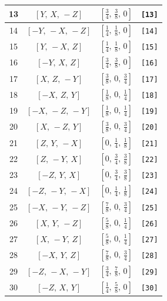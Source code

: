 \documentclass[fleqn,8pt]{jsarticle}
\begin{document}
\begin{longtable}{cccc}
13 & $\left[ Y,\, X,\, - Z \right]$ & $\left[ \frac{3}{4},\, \frac{3}{8},\, 0 \right]$ & {\tt [13]} \\ \hline
14 & $\left[ - Y,\, - X,\, - Z \right]$ & $\left[ \frac{1}{4},\, \frac{1}{8},\, 0 \right]$ & {\tt [14]} \\ \hline
15 & $\left[ Y,\, - X,\, Z \right]$ & $\left[ \frac{1}{4},\, \frac{1}{8},\, 0 \right]$ & {\tt [15]} \\ \hline
16 & $\left[ - Y,\, X,\, Z \right]$ & $\left[ \frac{3}{4},\, \frac{3}{8},\, 0 \right]$ & {\tt [16]} \\ \hline
17 & $\left[ X,\, Z,\, - Y \right]$ & $\left[ \frac{3}{8},\, 0,\, \frac{3}{4} \right]$ & {\tt [17]} \\ \hline
18 & $\left[ - X,\, Z,\, Y \right]$ & $\left[ \frac{1}{8},\, 0,\, \frac{1}{4} \right]$ & {\tt [18]} \\ \hline
19 & $\left[ - X,\, - Z,\, - Y \right]$ & $\left[ \frac{1}{8},\, 0,\, \frac{1}{4} \right]$ & {\tt [19]} \\ \hline
20 & $\left[ X,\, - Z,\, Y \right]$ & $\left[ \frac{3}{8},\, 0,\, \frac{3}{4} \right]$ & {\tt [20]} \\ \hline
21 & $\left[ Z,\, Y,\, - X \right]$ & $\left[ 0,\, \frac{1}{4},\, \frac{1}{8} \right]$ & {\tt [21]} \\ \hline
22 & $\left[ Z,\, - Y,\, X \right]$ & $\left[ 0,\, \frac{3}{4},\, \frac{3}{8} \right]$ & {\tt [22]} \\ \hline
23 & $\left[ - Z,\, Y,\, X \right]$ & $\left[ 0,\, \frac{3}{4},\, \frac{3}{8} \right]$ & {\tt [23]} \\ \hline
24 & $\left[ - Z,\, - Y,\, - X \right]$ & $\left[ 0,\, \frac{1}{4},\, \frac{1}{8} \right]$ & {\tt [24]} \\ \hline
25 & $\left[ - X,\, - Y,\, - Z \right]$ & $\left[ \frac{7}{8},\, 0,\, \frac{3}{4} \right]$ & {\tt [25]} \\ \hline
26 & $\left[ X,\, Y,\, - Z \right]$ & $\left[ \frac{5}{8},\, 0,\, \frac{1}{4} \right]$ & {\tt [26]} \\ \hline
27 & $\left[ X,\, - Y,\, Z \right]$ & $\left[ \frac{5}{8},\, 0,\, \frac{1}{4} \right]$ & {\tt [27]} \\ \hline
28 & $\left[ - X,\, Y,\, Z \right]$ & $\left[ \frac{7}{8},\, 0,\, \frac{3}{4} \right]$ & {\tt [28]} \\ \hline
29 & $\left[ - Z,\, - X,\, - Y \right]$ & $\left[ \frac{3}{4},\, \frac{7}{8},\, 0 \right]$ & {\tt [29]} \\ \hline
30 & $\left[ - Z,\, X,\, Y \right]$ & $\left[ \frac{1}{4},\, \frac{5}{8},\, 0 \right]$ & {\tt [30]} \\ \hline

\end{longtable}
\end{document}
